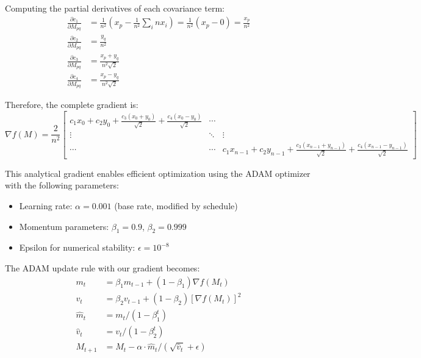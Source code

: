 Computing the partial derivatives of each covariance term:
\begin{align}
\frac{\partial c_1}{\partial M_{pq}} &= \frac{1}{n^2}\left(x_p - \frac{1}{n^2}\sum_{i} n x_i\right) = \frac{1}{n^2}\left(x_p - 0\right) = \frac{x_p}{n^2} \\
\frac{\partial c_2}{\partial M_{pq}} &= \frac{y_q}{n^2} \\
\frac{\partial c_3}{\partial M_{pq}} &= \frac{x_p + y_q}{n^2\sqrt{2}} \\
\frac{\partial c_4}{\partial M_{pq}} &= \frac{x_p - y_q}{n^2\sqrt{2}}
\end{align}

Therefore, the complete gradient is:
\begin{equation}
\nabla f(M) = \frac{2}{n^2}\begin{bmatrix}
c_1 x_0 + c_2 y_0 + \frac{c_3(x_0+y_0)}{\sqrt{2}} + \frac{c_4(x_0-y_0)}{\sqrt{2}} & \cdots \\
\vdots & \ddots & \vdots \\
\cdots & \cdots & c_1 x_{n-1} + c_2 y_{n-1} + \frac{c_3(x_{n-1}+y_{n-1})}{\sqrt{2}} + \frac{c_4(x_{n-1}-y_{n-1})}{\sqrt{2}}
\end{bmatrix}
\end{equation}

This analytical gradient enables efficient optimization using the ADAM optimizer with the following parameters:
\begin{itemize}
    \item Learning rate: $\alpha = 0.001$ (base rate, modified by schedule)
    \item Momentum parameters: $\beta_1 = 0.9$, $\beta_2 = 0.999$
    \item Epsilon for numerical stability: $\epsilon = 10^{-8}$
\end{itemize}

The ADAM update rule with our gradient becomes:
\begin{align}
m_t &= \beta_1 m_{t-1} + (1-\beta_1) \nabla f(M_t) \\
v_t &= \beta_2 v_{t-1} + (1-\beta_2) [\nabla f(M_t)]^2 \\
\hat{m}_t &= m_t / (1 - \beta_1^t) \\
\hat{v}_t &= v_t / (1 - \beta_2^t) \\
M_{t+1} &= M_t - \alpha \cdot \hat{m}_t / (\sqrt{\hat{v}_t} + \epsilon)
\end{align}

